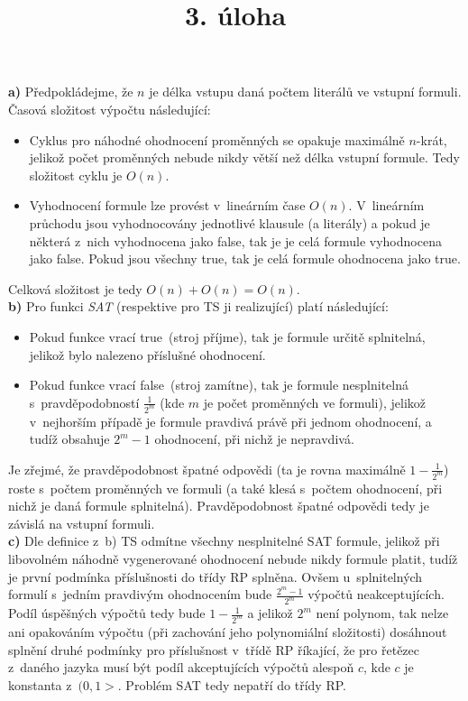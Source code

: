 \documentclass[a4paper]{article}
\title {3. úloha}
\newcommand{\fls}{false}
\newcommand{\tre}{true}
\begin{document}
\section*{}
\textbf{a)} Předpokládejme, že $n$ je délka vstupu daná počtem literálů ve vstupní formuli.
Časová složitost výpočtu následující:
\begin{itemize}
    \item Cyklus pro náhodné ohodnocení proměnných se opakuje maximálně $n$-krát, jelikož počet proměnných nebude nikdy větší než
     délka vstupní formule.
    Tedy složitost cyklu je $O(n)$.
    \item Vyhodnocení formule lze provést v~lineárním čase $O(n)$.
    V~lineárním průchodu jsou vyhodnocovány jednotlivé klausule (a literály) a pokud je některá z~nich vyhodnocena jako \fls, tak je
    je celá formule vyhodnocena jako \fls.
    Pokud jsou všechny \tre, tak je celá formule ohodnocena jako \tre.
\end{itemize}
Celková složitost je tedy $O(n)+O(n)=O(n)$.
\\

\noindent\textbf{b)} Pro funkci \emph{SAT} (respektive pro TS ji realizující) platí následující:
\begin{itemize}
    \item Pokud funkce vrací \tre\ (stroj příjme), tak je formule určitě splnitelná, jelikož bylo nalezeno příslušné ohodnocení.
    \item Pokud funkce vrací \fls\ (stroj zamítne), tak je formule nesplnitelná s~pravděpodobností $\frac{1}{2^m}$ (kde $m$ je počet proměnných
    ve formuli), jelikož v~nejhorším případě je formule pravdivá právě při jednom ohodnocení, a tudíž obsahuje $2^m-1$ ohodnocení,
    při nichž je nepravdivá.
\end{itemize}
Je zřejmé, že pravděpodobnost špatné odpovědi (ta je rovna maximálně $1-\frac{1}{2^m}$) roste s~počtem proměnných ve formuli
(a také klesá s~počtem ohodnocení, při nichž je daná formule splnitelná).
Pravděpodobnost špatné odpovědi tedy je závislá na vstupní formuli.
\\

\noindent\textbf{c)} Dle definice z~b) TS odmítne všechny nesplnitelné SAT formule, jelikož při libovolném náhodně vygenerované ohodnocení nebude
nikdy formule platit, tudíž je první podmínka příslušnosti do třídy RP splněna.
Ovšem u~splnitelných formulí s~jedním pravdivým ohodnocením bude $\frac{2^m-1}{2^m}$ výpočtů neakceptujících.
Podíl úspěšných výpočtů tedy bude $1-\frac{1}{2^m}$ a jelikož $2^m$ není polynom, tak nelze ani opakováním výpočtu (při zachování jeho polynomiální složitosti) 
dosáhnout splnění druhé podmínky pro příslušnost v~třídě RP říkající,
že pro řetězec z~daného jazyka musí být podíl akceptujících výpočtů alespoň $c$, kde $c$ je konstanta z~$(0,1>$.
Problém SAT tedy nepatří do třídy RP.
\end{document}
